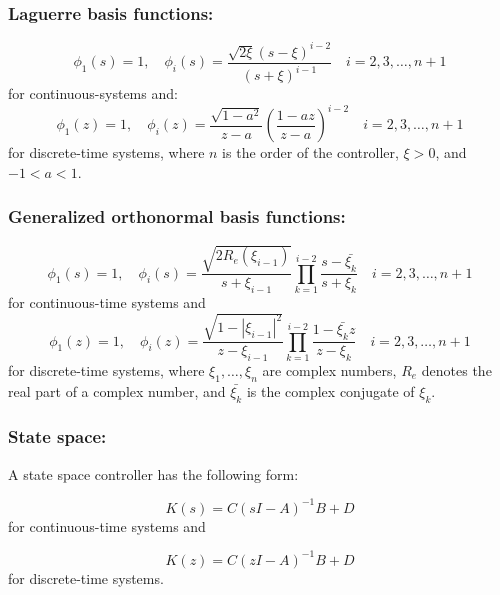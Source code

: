 \documentclass [12pt , a4paper] {report}
\begin{document}
\subsubsection{Laguerre basis functions:}

\begin{equation}
\phi_1(s)=1, \quad \phi_i(s)=\frac{\sqrt{2\xi}(s-\xi)^{i-2}}{(s+\xi)^{i-1}} \quad   i=2,3,\ldots,n+1 
\end{equation}
for continuous-systems and:
\begin{equation}
\phi_1(z)=1, \quad \phi_i(z)=\frac{\sqrt{1-a^2}}{z-a} \left(\frac{1-az}{z-a}\right)^{i-2} \quad   i=2,3,\ldots,n+1 
\end{equation}
for discrete-time systems, where $n$ is the order of the controller, $\xi>0$, and $-1<a<1$.

\subsubsection{Generalized orthonormal basis functions:}

\begin{equation}
\phi_1(s)=1, \quad \phi_i(s)=\frac{\sqrt{2R_e(\xi_{i-1})}}{s+\xi_{i-1}} \prod_{k=1}^{i-2}\frac{s-\bar{\xi_k}}{s+\xi_k} \quad  i=2,3,\ldots,n+1 
\end{equation}
for continuous-time systems and
\begin{equation}
\phi_1(z)=1, \quad \phi_i(z)=\frac{\sqrt{1-|\xi_{i-1}|^2}}{z-\xi_{i-1}} \prod_{k=1}^{i-2}\frac{1-\bar{\xi_k}z}{z-\xi_k} \quad  i=2,3,\ldots,n+1 
\end{equation}
for discrete-time systems,
where $\xi_1, \ldots, \xi_n$ are complex numbers, $R_e$ denotes the real part of a complex number, and $\bar{\xi_k}$ is the complex conjugate of $\xi_k$.

\subsubsection{State space:}
A state space controller has the following form:

\begin{equation}
    K(s) = C \left(s I - A\right)^{-1} B + D
\end{equation}
for continuous-time systems and 

\begin{equation}
    K(z) = C \left(z I - A\right)^{-1} B + D
\end{equation}
for discrete-time systems.
\end{document}
